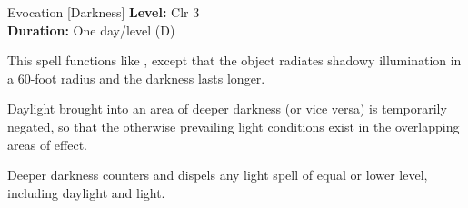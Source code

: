 {Evocation [Darkness]}
{
	\textbf{Level:}
	Clr 3\\
	\textbf{Duration:}
	One day/level (D)\\
}
{
	This spell functions like , except that the object radiates shadowy illumination in a 60-foot radius and the darkness lasts longer.

Daylight brought into an area of deeper darkness (or vice versa) is temporarily negated, so that the otherwise prevailing light conditions exist in the overlapping areas of effect.

	Deeper darkness counters and dispels any light spell of equal or lower level, including daylight and light.

}

